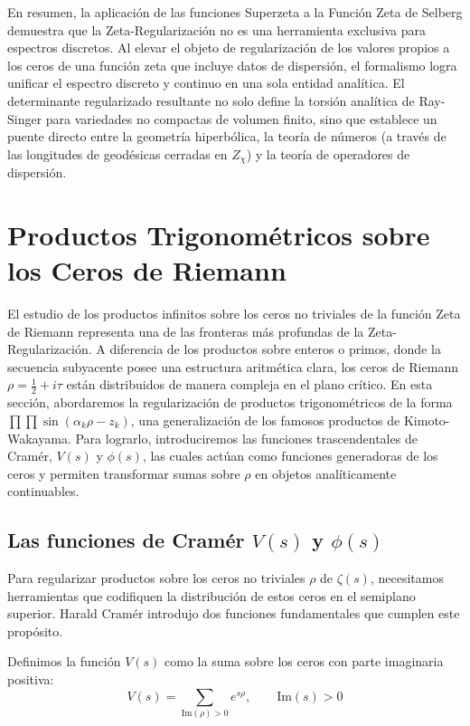 En resumen, la aplicación de las funciones Superzeta a la Función Zeta de Selberg demuestra que la Zeta-Regularización no es una herramienta exclusiva para espectros discretos. Al elevar el objeto de regularización de los valores propios a los ceros de una función zeta que incluye datos de dispersión, el formalismo logra unificar el espectro discreto y continuo en una sola entidad analítica. El determinante regularizado resultante no solo define la torsión analítica de Ray-Singer para variedades no compactas de volumen finito, sino que establece un puente directo entre la geometría hiperbólica, la teoría de números (a través de las longitudes de geodésicas cerradas en $Z_\chi$) y la teoría de operadores de dispersión.

\section{Productos Trigonométricos sobre los Ceros de Riemann}

El estudio de los productos infinitos sobre los ceros no triviales de la función Zeta de Riemann representa una de las fronteras más profundas de la Zeta-Regularización. A diferencia de los productos sobre enteros o primos, donde la secuencia subyacente posee una estructura aritmética clara, los ceros de Riemann $\rho = \frac{1}{2} + i\tau$ están distribuidos de manera compleja en el plano crítico. En esta sección, abordaremos la regularización de productos trigonométricos de la forma $\prod\prod \sin(\alpha_k \rho - z_k)$, una generalización de los famosos productos de Kimoto-Wakayama. Para lograrlo, introduciremos las funciones trascendentales de Cramér, $V(s)$ y $\phi(s)$, las cuales actúan como funciones generadoras de los ceros y permiten transformar sumas sobre $\rho$ en objetos analíticamente continuables.

\subsection{Las funciones de Cramér $V(s)$ y $\phi(s)$}

Para regularizar productos sobre los ceros no triviales $\rho$ de $\zeta(s)$, necesitamos herramientas que codifiquen la distribución de estos ceros en el semiplano superior. Harald Cramér introdujo dos funciones fundamentales que cumplen este propósito.

Definimos la función $V(s)$ como la suma sobre los ceros con parte imaginaria positiva:
$$ V(s) = \sum_{\text{Im}(\rho)>0} e^{s\rho}, \qquad \text{Im}(s) > 0 $$

